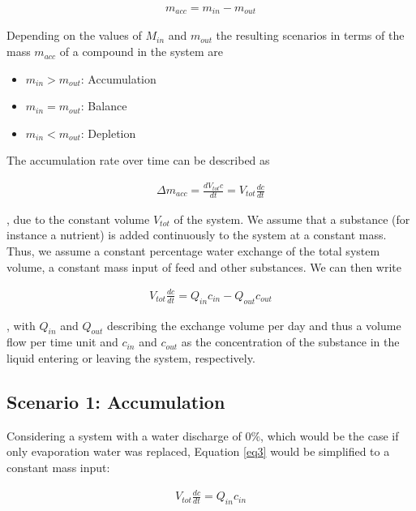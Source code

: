 \documentclass{scrartcl}
\begin{document}
\begin{align}
	m_{acc} = m_{in} - m_{out}
	\label{eq1}
\end{align}

Depending on the values of $M_{in}$ and $m_{out}$ the resulting scenarios in terms of the mass $m_{acc}$ of a compound in the system are

\begin{itemize}
	\item $m_{in} > m_{out}$: Accumulation
 	\item $m_{in} = m_{out}$: Balance
 	\item $m_{in} < m_{out}$: Depletion
\end{itemize}

The accumulation rate over time can be described as 

\begin{align}
	\Delta m_{acc} = \frac{dV_{tot}c}{dt} = V_{tot}\frac{dc}{dt}
	\label{eq2}
\end{align}

, due to the constant volume $V_{tot}$ of the system. We assume that a substance (for instance a nutrient) is added continuously to the system at a constant mass. Thus, we assume a constant percentage water exchange of the total system volume, a constant mass input of feed and other substances. We can then write

\begin{align}
	V_{tot}\frac{dc}{dt} = Q_{in}c_{in} - Q_{out}c_{out}
	\label{eq3}
\end{align}

, with $Q_{in}$ and $Q_{out}$ describing the exchange volume per day and thus a volume flow per time unit and $c_{in}$ and $c_{out}$ as the concentration of the substance in the liquid entering or leaving the system, respectively. 




\subsection{Scenario 1: Accumulation}
Considering a system with a water discharge of $0\%$, which would be the case if only evaporation water was replaced, Equation \ref{eq3} would be simplified to a constant mass input:

\begin{align}
	V_{tot}\frac{dc}{dt} = Q_{in}c_{in}	
	\label{eq3.1}
\end{align}
\end{document}

